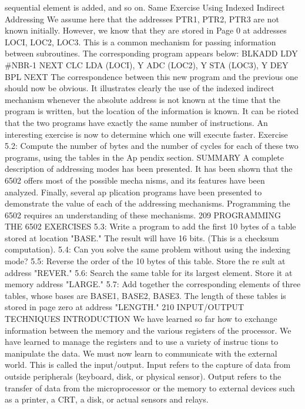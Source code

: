 \documentclass{book}
\begin{document}
sequential element is added, and so on.
Same Exercise Using Indexed Indirect Addressing
We assume here that the addresses PTR1, PTR2, PTR3 are not
known initially. However, we know that they are stored in Page 0
at addresses LOCI, LOC2, LOC3. This is a common mechanism
for passing information between subroutines. The corresponding
program appears below:
BLKADD LDY #NBR-1
NEXT CLC
LDA (LOCI), Y
ADC (LOC2), Y
STA (LOC3), Y
DEY
BPL NEXT
The correspondence between this new program and the previous
one should now be obvious. It illustrates clearly the use of the
indexed indirect mechanism whenever the absolute address is not
known at the time that the program is written, but the location of the
information is known. It can be rioted that the two programs
have exactly the same number of instructions. An interesting
exercise is now to determine which one will execute faster.
Exercise 5.2: Compute the number of bytes and the number of
cycles for each of these two programs, using the tables in the Ap
pendix section.
SUMMARY
A complete description of addressing modes has been presented.
It has been shown that the 6502 offers most of the possible mecha
nisms, and its features have been analyzed. Finally, several ap
plication programs have been presented to demonstrate the value
of each of the addressing mechanisms. Programming the 6502
requires an understanding of these mechanisms.
209
PROGRAMMING THE 6502
EXERCISES
5.3: Write a program to add the first 10 bytes of a table stored at
location "BASE." The result will have 16 bits. (This is a
checksum computation).
5.4: Can you solve the same problem without using the indexing
mode?
5.5: Reverse the order of the 10 bytes of this table. Store the re
sult at address "REVER."
5.6: Search the same table for its largest element. Store it at
memory address "LARGE."
5.7: Add together the corresponding elements of three tables,
whose bases are BASE1, BASE2, BASE3. The length of
these tables is stored in page zero at address "LENGTH."
210
INPUT/OUTPUT TECHNIQUES
INTRODUCTION
We have learned so far how to exchange information between the
memory and the various registers of the processor. We have
learned to manage the registers and to use a variety of instruc
tions to manipulate the data. We must now learn to communicate
with the external world. This is called the input/output.
Input refers to the capture of data from outside peripherals
(keyboard, disk, or physical sensor). Output refers to the transfer
of data from the microprocessor or the memory to external devices
such as a printer, a CRT, a disk, or actual sensors and relays.
\end{document}
